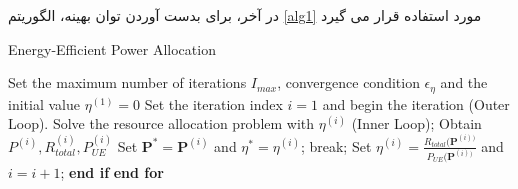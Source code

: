   در آخر، برای بدست آوردن توان بهینه، الگوریتم \eqref{alg1} مورد استفاده قرار می گیرد \cite{hcranEE}
 \begin{latin}
\begin{algorithm}
\caption{Energy-Efficient Power Allocation}\label{alg1}
\begin{algorithmic}

\State Set the maximum number of iterations $I_{max}$, convergence condition $\epsilon_{\eta}$  and the initial value $\eta^{(1)} = 0$
\State Set the iteration index $i = 1$ and begin the iteration (Outer
Loop).
\State Solve the resource allocation problem with $\eta^{(i)}$ (Inner Loop);
\State Obtain $P^{(i)}, R_{total}^{(i)}, P_{UE}^{(i)}$
\State Set $\boldsymbol{P}^*= \boldsymbol{P}^{(i)} $   and  $ \eta^{*} =\eta^{(i)} $;
\State break;
\Else
\State Set $\eta^{(i)}= \frac{R_{total}(\boldsymbol{P}^{(i))}}{P_{UE}(\boldsymbol{P}^{(i))}}$ and $i= i+1$;
\EndIf 
\State \textbf{end if}
\EndFor 
\State \textbf{end for}

\end{algorithmic}
\end{algorithm}
\end{latin}
